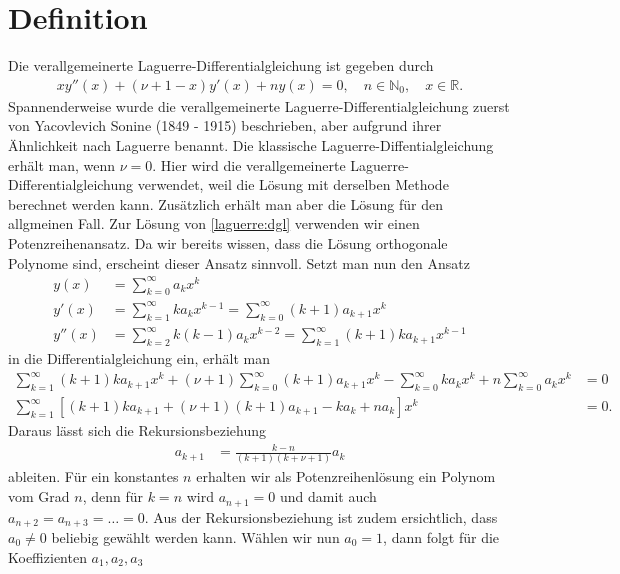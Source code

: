 %
%
%
\section{Definition
  \label{laguerre:section:definition}}
Die verallgemeinerte Laguerre-Differentialgleichung ist gegeben durch
\begin{align}
x y''(x) + (\nu + 1 - x) y'(x) + n y(x)
=
0
, \quad
n \in \mathbb{N}_0
, \quad
x \in \mathbb{R}
\label{laguerre:dgl}
.
\end{align}
Spannenderweise wurde die verallgemeinerte Laguerre-Differentialgleichung
zuerst von Yacovlevich Sonine (1849 - 1915) beschrieben,
aber aufgrund ihrer Ähnlichkeit nach Laguerre benannt.
Die klassische Laguerre-Diffentialgleichung erhält man, wenn $\nu = 0$.
Hier wird die verallgemeinerte Laguerre-Differentialgleichung verwendet,
weil die Lösung mit derselben Methode berechnet werden kann.
Zusätzlich erhält man aber die Lösung für den allgmeinen Fall.
Zur Lösung von \eqref{laguerre:dgl} verwenden wir einen
Potenzreihenansatz.
Da wir bereits wissen, dass die Lösung orthogonale Polynome sind,
erscheint dieser Ansatz sinnvoll.
Setzt man nun den Ansatz
\begin{align*}
y(x)
 & =
\sum_{k=0}^\infty a_k x^k
\\
y'(x)
 & =
\sum_{k=1}^\infty k a_k x^{k-1}
=
\sum_{k=0}^\infty (k+1) a_{k+1} x^k
\\
y''(x)
 & =
\sum_{k=2}^\infty k (k-1) a_k x^{k-2}
=
\sum_{k=1}^\infty (k+1) k a_{k+1} x^{k-1}
\end{align*}
in die Differentialgleichung ein, erhält man
\begin{align*}
\sum_{k=1}^\infty (k+1) k a_{k+1} x^k
+
(\nu + 1)\sum_{k=0}^\infty (k+1) a_{k+1} x^k
-
\sum_{k=0}^\infty k a_k x^k
+
n \sum_{k=0}^\infty a_k x^k
 & =
0    \\
\sum_{k=1}^\infty
\left[ (k+1) k a_{k+1} + (\nu + 1)(k+1) a_{k+1} - k a_k + n a_k \right] x^k
 & =
0.
\end{align*}
Daraus lässt sich die Rekursionsbeziehung
\begin{align*}
a_{k+1}
 & =
\frac{k-n}{(k+1) (k + \nu + 1)} a_k
\end{align*}
ableiten.
Für ein konstantes $n$ erhalten wir als Potenzreihenlösung ein Polynom vom Grad
$n$,
denn für $k=n$ wird $a_{n+1} = 0$ und damit auch $a_{n+2}=a_{n+3}=\ldots=0$.
Aus der Rekursionsbeziehung ist zudem ersichtlich,
dass $a_0 \neq 0$ beliebig gewählt werden kann.
Wählen wir nun $a_0 = 1$, dann folgt für die Koeffizienten $a_1, a_2, a_3$
